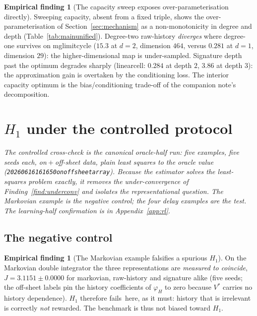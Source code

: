 \documentclass[11pt]{article}
\renewcommand{\_}{\discretionary{\textunderscore}{}{\textunderscore}}
\theoremstyle{plain}
\theoremstyle{definition}
\newtheorem{finding}[theorem]{Empirical finding}
\newcommand{\failsv}{\textcolor{black!55}{fails}}
\begin{document}
\begin{finding}[The capacity sweep exposes over-parameterisation directly]\label{find:capacity}
Sweeping capacity, absent from a fixed triple, shows the over-parameterisation of
Section~\ref{sec:mechanism} as a non-monotonicity in degree and depth
(Table~\ref{tab:mainunified}). Degree-two raw-history \emph{diverges} where degree-one survives
on mg\_limit\_cycle ($15.3$ at $d=2$, dimension $464$, versus $0.281$ at $d=1$, dimension $29$):
the higher-dimensional map is under-sampled. Signature depth past the optimum degrades sharply
(linear\_cell: $0.284$ at depth $2$, $3.86$ at depth $3$): the approximation gain is overtaken by
the conditioning loss. The interior capacity optimum is the bias/conditioning trade-off of the
companion note's decomposition.
\end{finding}

\section{$H_1$ under the controlled protocol}\label{sec:h1}

\emph{The controlled cross-check is the canonical oracle-half run: five examples, five seeds each,
on${}+{}$off-sheet data, plain least squares to the oracle value
(\texttt{20260616\_161650\_on\_off\_sheet\_array}). Because the estimator solves the least-squares
problem exactly, it removes the under-convergence of Finding~\ref{find:underconv} and isolates
the representational question. The Markovian example is the negative control; the four delay examples
are the test. The learning-half confirmation is in Appendix~\ref{app:rl}.}

\subsection{The negative control}

\begin{finding}[The Markovian example falsifies a spurious $H_1$]\label{find:negcontrol}
On the Markovian double integrator the three representations are \emph{measured to coincide},
$J=3.1151\pm0.0000$ for markovian, raw-history and signature alike (five seeds; the off-sheet
labels pin the history coefficients of $\varphi_H$ to zero because $V^{\ast}$ carries no history
dependence). $H_1$ therefore \failsv\ here, as it must: history that is irrelevant is correctly
\emph{not} rewarded. The benchmark is thus not biased toward $H_1$.
\end{finding}
\end{document}
